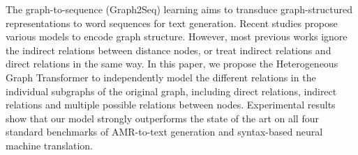 The graph-to-sequence (Graph2Seq) learning aims to transduce graph-structured representations to word sequences for text generation. Recent studies propose various models to encode graph structure. However, most previous works ignore the indirect relations between distance nodes, or treat indirect relations and direct relations in the same way. In this paper, we propose the Heterogeneous Graph Transformer to independently model the different relations in the individual subgraphs of the original graph, including direct relations, indirect relations and multiple possible relations between nodes. Experimental results show that our model strongly outperforms the state of the art on all four standard benchmarks of AMR-to-text generation and syntax-based neural machine translation.
